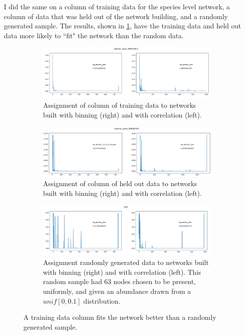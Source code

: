 \documentclass[10pt]{article}
\theoremstyle{definition}
\numberwithin{theorem}{section}
\numberwithin{definition}{section}
\numberwithin{lemma}{section}
\numberwithin{corollary}{section}
\numberwithin{clm}{section}
\numberwithin{rmk}{section}
\begin{document}
I did the same on a column of training data for the species level network, a column of data that was held out of the network building, and a randomly generated sample. The results, shown in \cref{full_assign}, have the training data and held out data more likely to ``fit" the network than the random data.

\begin{figure}
	\begin{subfigure}[b]{0.9\linewidth}
		\begin{center}
			\includegraphics[scale = 0.45]{a_nares.png}	
		\end{center}
		\caption{Assignment of column of training data to networks built with binning (right) and with correlation (left).}
	\end{subfigure}
	\begin{subfigure}[b]{0.9\linewidth}
		\begin{center}
			\includegraphics[scale = 0.45]{hldouts.png}	
		\end{center}
		\caption{Assignment of column of held out data to networks built with binning (right) and with correlation (left).}
	\end{subfigure}
	\begin{subfigure}[b]{0.9\linewidth}
		\begin{center}
			\includegraphics[scale = 0.45]{random.png}	
		\end{center}
		\caption{Assignment randomly generated data to networks built with binning (right) and with correlation (left). This random sample had 63 nodes chosen to be present, uniformly, and given an abundance drawn from a $unif[0,0.1]$ distribution.}
	\end{subfigure}
	\caption{A training data column fits the network better than a randomly generated sample.}\label{full_assign}
\end{figure}
\end{document}
